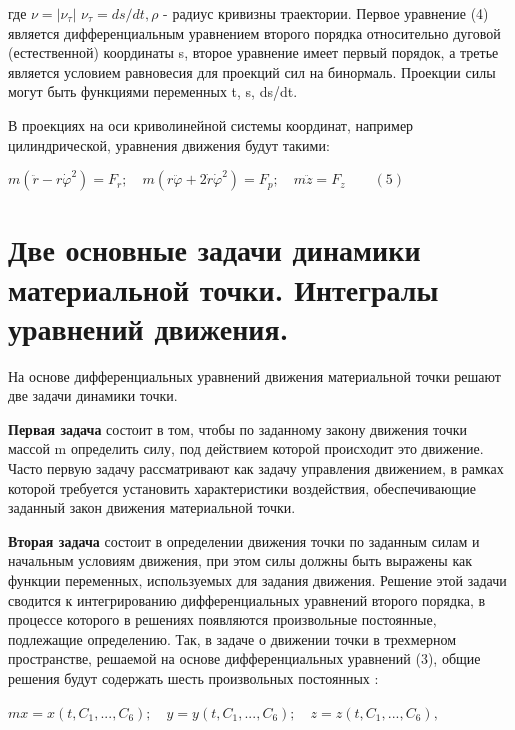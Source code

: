 {\begin{center}
    \par где $\nu = |\nu_{\tau}|$ $\nu_{\tau} = ds/dt, \rho$ - радиус кривизны траектории. Первое уравнение (4) является дифференциальным уравнением второго порядка относительно дуговой (естественной) координаты s, второе уравнение имеет первый порядок, а  третье является  условием равновесия для  проекций сил  на бинормаль. Проекции силы могут быть функциями переменных t, s, ds/dt.

    \par В проекциях на оси криволинейной  системы координат, например цилиндрической, уравнения движения будут такими:

    \par $m(\ddot{r} - r\dot{ \varphi}^{2}) = F_{r}; \quad m(r\ddot{\varphi} + 2\dot{r}\dot{ \varphi}^{2}) = F_{p}; \quad m\ddot{z} = F_{z} \qquad (5)$
\end{center}

\section{Две основные задачи динамики материальной точки. Интегралы уравнений движения.}
\begin{center}
\par На  основе  дифференциальных  уравнений  движения  материальной точки решают две задачи динамики точки.
\par \textbf{Первая задача } состоит в том, чтобы по заданному закону движения точки массой m определить силу, под действием которой происходит это движение. Часто  первую  задачу  рассматривают  как  задачу  управления  движением,  в рамках которой  требуется установить характеристики  воздействия, обеспечивающие заданный закон движения материальной точки.
\par \textbf{Вторая задача } состоит в определении движения точки по заданным силам и начальным условиям движения, при этом силы должны быть выражены как функции переменных,  используемых для  задания движения.  Решение этой задачи  сводится  к  интегрированию  дифференциальных  уравнений  второго порядка, в процессе которого в решениях появляются произвольные постоянные, подлежащие определению.
Так, в задаче о движении точки в трехмерном пространстве, решаемой на основе дифференциальных уравнений (3), общие решения будут содержать шесть произвольных постоянных :

\par $m x = x(t,C_{1},...,C_{6}); \quad y = y(t,C_{1},...,C_{6}); \quad z = z(t,C_{1},...,C_{6}), $


\end{center}}
